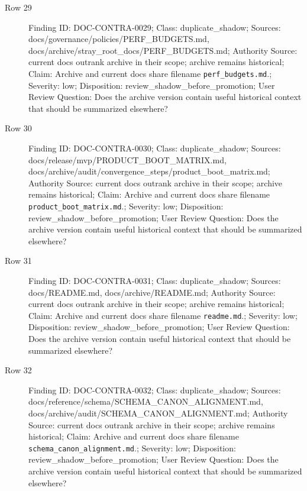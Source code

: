 \documentclass[10.5pt,a4paper,openany]{book}
\begin{document}
\begin{description}
\item[Row 29] Finding ID: DOC-\allowbreak{}CONTRA-\allowbreak{}0029; Class: duplicate\_\allowbreak{}shadow; Sources: docs/\allowbreak{}governance/\allowbreak{}policies/\allowbreak{}PERF\_\allowbreak{}BUDGETS.\allowbreak{}md, docs/\allowbreak{}archive/\allowbreak{}stray\_\allowbreak{}root\_\allowbreak{}docs/\allowbreak{}PERF\_\allowbreak{}BUDGETS.\allowbreak{}md; Authority Source: current docs outrank archive in their scope; archive remains historical; Claim: Archive and current docs share filename \texttt{perf\_\allowbreak{}budgets.\allowbreak{}md}.\allowbreak{}; Severity: low; Disposition: review\_\allowbreak{}shadow\_\allowbreak{}before\_\allowbreak{}promotion; User Review Question: Does the archive version contain useful historical context that should be summarized elsewhere?
\item[Row 30] Finding ID: DOC-\allowbreak{}CONTRA-\allowbreak{}0030; Class: duplicate\_\allowbreak{}shadow; Sources: docs/\allowbreak{}release/\allowbreak{}mvp/\allowbreak{}PRODUCT\_\allowbreak{}BOOT\_\allowbreak{}MATRIX.\allowbreak{}md, docs/\allowbreak{}archive/\allowbreak{}audit/\allowbreak{}convergence\_\allowbreak{}steps/\allowbreak{}product\_\allowbreak{}boot\_\allowbreak{}matrix.\allowbreak{}md; Authority Source: current docs outrank archive in their scope; archive remains historical; Claim: Archive and current docs share filename \texttt{product\_\allowbreak{}boot\_\allowbreak{}matrix.\allowbreak{}md}.\allowbreak{}; Severity: low; Disposition: review\_\allowbreak{}shadow\_\allowbreak{}before\_\allowbreak{}promotion; User Review Question: Does the archive version contain useful historical context that should be summarized elsewhere?
\item[Row 31] Finding ID: DOC-\allowbreak{}CONTRA-\allowbreak{}0031; Class: duplicate\_\allowbreak{}shadow; Sources: docs/\allowbreak{}README.\allowbreak{}md, docs/\allowbreak{}archive/\allowbreak{}README.\allowbreak{}md; Authority Source: current docs outrank archive in their scope; archive remains historical; Claim: Archive and current docs share filename \texttt{readme.\allowbreak{}md}.\allowbreak{}; Severity: low; Disposition: review\_\allowbreak{}shadow\_\allowbreak{}before\_\allowbreak{}promotion; User Review Question: Does the archive version contain useful historical context that should be summarized elsewhere?
\item[Row 32] Finding ID: DOC-\allowbreak{}CONTRA-\allowbreak{}0032; Class: duplicate\_\allowbreak{}shadow; Sources: docs/\allowbreak{}reference/\allowbreak{}schema/\allowbreak{}SCHEMA\_\allowbreak{}CANON\_\allowbreak{}ALIGNMENT.\allowbreak{}md, docs/\allowbreak{}archive/\allowbreak{}audit/\allowbreak{}SCHEMA\_\allowbreak{}CANON\_\allowbreak{}ALIGNMENT.\allowbreak{}md; Authority Source: current docs outrank archive in their scope; archive remains historical; Claim: Archive and current docs share filename \texttt{schema\_\allowbreak{}canon\_\allowbreak{}alignment.\allowbreak{}md}.\allowbreak{}; Severity: low; Disposition: review\_\allowbreak{}shadow\_\allowbreak{}before\_\allowbreak{}promotion; User Review Question: Does the archive version contain useful historical context that should be summarized elsewhere?

\end{description}
\end{document}
